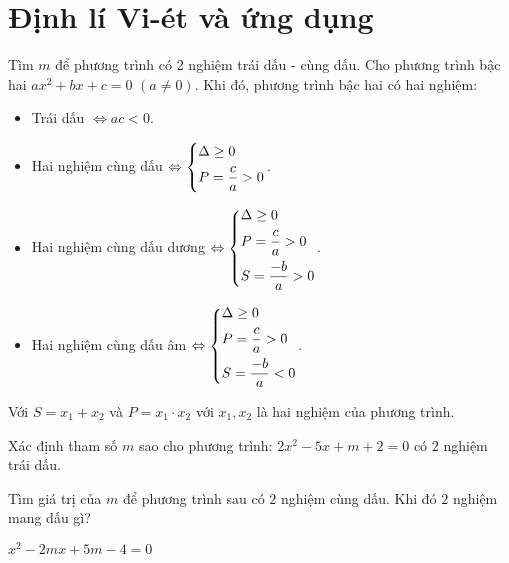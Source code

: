 \section{Định lí Vi-ét và ứng dụng}
\setcounter{ex}{0}
\begin{dang}{Tìm $m$ để phương trình có 2 nghiệm trái dấu - cùng dấu.}
	Cho phương trình bậc hai $ ax^2+bx+c=0$ $(a\neq 0)$. Khi đó, phương trình bậc hai có hai nghiệm:
	\begin{itemize}
		\item Trái dấu $\Leftrightarrow ac<0$.
		\item Hai nghiệm cùng dấu $\Leftrightarrow \left\{\begin{aligned}&\Delta \geq 0\\&P=\dfrac{c}{a}>0\end{aligned}\right.$.
		\item Hai nghiệm cùng dấu dương $\Leftrightarrow \left\{\begin{aligned}&\Delta \geq 0\\&P=\dfrac{c}{a}>0\\&S=\dfrac{-b}{a}>0\end{aligned}\right.$.
		\item Hai nghiệm cùng dấu âm $\Leftrightarrow \left\{\begin{aligned}&\Delta \geq 0\\&P=\dfrac{c}{a}>0\\&S=\dfrac{-b}{a}<0\end{aligned}\right.$.
	\end{itemize}
	Với $S=x_1+x_2$ và $P=x_1\cdot x_2$ với $x_1,x_2$ là hai nghiệm của phương trình.
\end{dang}
\begin{ex}%
	Xác định tham số $m$ sao cho phương trình:
	$2x^2-5x+m+2=0$ có $2$ nghiệm trái dấu.
\end{ex}
\begin{ex}%
	Tìm giá trị của $m$ để phương trình sau có $2$ nghiệm cùng dấu. Khi đó $2$ nghiệm mang dấu gì?
	\begin{center}
		$x^2-2mx+5m-4=0$  
	\end{center}      
\end{ex}
